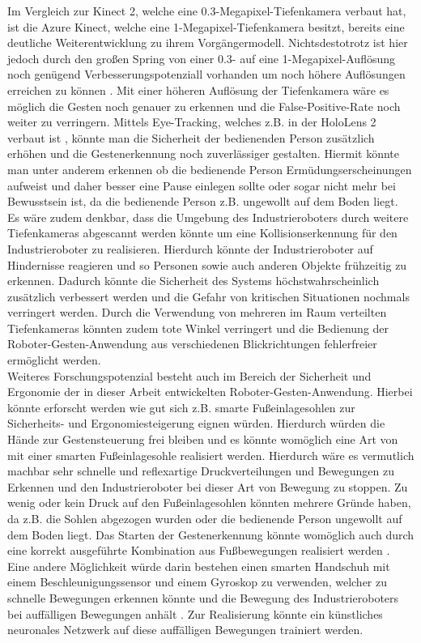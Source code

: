 Im Vergleich zur Kinect 2, welche eine \num{0,3}-Megapixel-Tiefenkamera verbaut hat, ist die Azure Kinect, welche eine 1-Megapixel-Tiefenkamera besitzt, bereits eine deutliche Weiterentwicklung zu ihrem Vorgängermodell. Nichtsdestotrotz ist hier jedoch durch den großen Spring von einer \num{0,3}- auf eine 1-Megapixel-Auflösung noch genügend Verbesserungspotenziall vorhanden um noch höhere Auflösungen erreichen zu können \cite{bamji__2018}. Mit einer höheren Auflösung der Tiefenkamera wäre es möglich die Gesten noch genauer zu erkennen und die False-Positive-Rate noch weiter zu verringern. Mittels Eye-Tracking, welches z.B. in der HoloLens 2 verbaut ist \cite{hololens2_hardware_nodate}, könnte man die Sicherheit der bedienenden Person zusätzlich erhöhen und die Gestenerkennung noch zuverlässiger gestalten. Hiermit könnte man unter anderem erkennen ob die bedienende Person Ermüdungserscheinungen aufweist und daher besser eine Pause einlegen sollte oder sogar nicht mehr bei Bewusstsein ist, da die bedienende Person z.B. ungewollt auf dem Boden liegt.\\

Es wäre zudem denkbar, dass die Umgebung des Industrieroboters durch weitere Tiefenkameras abgescannt werden könnte um eine Kollisionserkennung für den Industrieroboter zu realisieren. Hierdurch könnte der Industrieroboter auf Hindernisse reagieren und so Personen sowie auch anderen Objekte frühzeitig zu erkennen. Dadurch könnte die Sicherheit des Systems höchstwahrscheinlich zusätzlich verbessert werden und die Gefahr von kritischen Situationen nochmals verringert werden. Durch die Verwendung von mehreren im Raum verteilten Tiefenkameras könnten zudem tote Winkel verringert und die Bedienung der Roboter-Gesten-Anwendung aus verschiedenen Blickrichtungen fehlerfreier ermöglicht werden.\\

Weiteres Forschungspotenzial besteht auch im Bereich der Sicherheit und Ergonomie der in dieser Arbeit entwickelten Roboter-Gesten-Anwendung. Hierbei könnte erforscht werden wie gut sich z.B. smarte Fußeinlagesohlen zur Sicherheits- und Ergonomiesteigerung eignen würden. Hierdurch würden die Hände zur Gestensteuerung frei bleiben und es könnte womöglich eine Art von  mit einer smarten Fußeinlagesohle realisiert werden. Hierdurch wäre es vermutlich machbar sehr schnelle und reflexartige Druckverteilungen und Bewegungen zu Erkennen und den Industrieroboter bei dieser Art von Bewegung zu stoppen. Zu wenig oder kein Druck auf den Fußeinlagesohlen könnten mehrere Gründe haben, da z.B. die Sohlen abgezogen wurden oder die bedienende Person ungewollt auf dem Boden liegt. Das Starten der Gestenerkennung könnte womöglich auch durch eine korrekt ausgeführte Kombination aus Fußbewegungen realisiert werden \cite{tan_design_2015}. Eine andere Möglichkeit würde darin bestehen einen smarten Handschuh mit einem Beschleunigungssensor und einem Gyroskop zu verwenden, welcher zu schnelle Bewegungen erkennen könnte und die Bewegung des Industrieroboters bei auffälligen Bewegungen anhält \cite{ghimire_smart_2019}. Zur Realisierung könnte ein künstliches neuronales Netzwerk auf diese auffälligen Bewegungen trainiert werden.

